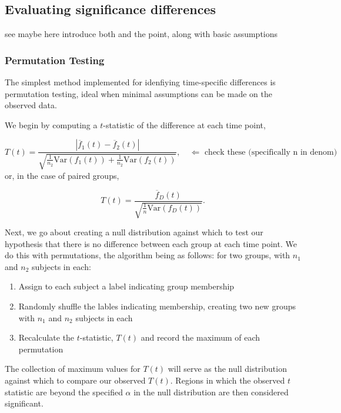 \documentclass{article}
\begin{document}
\subsection{Evaluating significance differences}

see maybe here introduce both and the point, along with basic assumptions

\subsubsection{Permutation Testing}

The simplest method implemented for idenfiying time-specific differences is permutation testing, ideal when minimal assumptions can be made on the observed data. 

We begin by computing a $t$-statistic of the difference at each time point, 

\begin{equation}
T(t) = \frac{|\overline{f}_1(t) - \overline{f}_2(t)|}{\sqrt{\frac{1}{n_2} \text{Var}(f_1(t)) + \frac{1}{n_2} \text{Var}(f_2(t))}}, \quad \Leftarrow \text{ check these (specifically n in denom)}
\end{equation}
or, in the case of paired groups, 

\begin{equation}
T(t) = \frac{\overline{f}_D(t)}{\sqrt{\frac1n \text{Var}(f_D(t))}}.
\end{equation}

Next, we go about creating a null distribution against which to test our hypothesis that there is no difference between each group at each time point. We do this with permutations, the algorithm being as follows: for two groups, with $n_1$ and $n_2$ subjects in each:

\begin{enumerate}
	\item Assign to each subject a label indicating group membership
	\item Randomly shuffle the lables indicating membership, creating two new groups with $n_1$ and $n_2$ subjects in each
	\item Recalculate the $t$-statistic, $T(t)$ and record the maximum of each permutation
\end{enumerate}

The collection of maximum values for $T(t)$ will serve as the null distribution against which to compare our observed $T(t)$. Regions in which the observed $t$ statistic are beyond the specified $\alpha$ in the null distribution are then considered significant.
\end{document}
